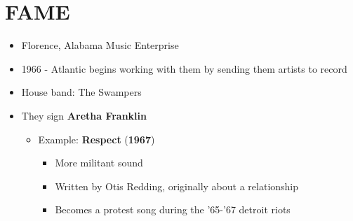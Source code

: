 \documentclass[11pt]{report}
\newcommand{\imp}[1]{\textbf{#1}}
\newcommand{\idate}[2]{\textcolor{blue!50}{\imp{#1}}\label{date:#2}}
\newcommand{\bl}{\begin{itemize}}
\newcommand{\kl}{\end{itemize}}
\newcommand{\song}[2]{\textcolor{red!70}{\textbf{#1}} (\idate{#2}{#1})}
\begin{document}
\section{FAME}
\begin{itemize}
	\item Florence, Alabama Music Enterprise
	\item 1966 - Atlantic begins working with them by sending them artists to record
	\item House band: The Swampers
	\item They sign \textbf{Aretha Franklin}
	\bl
		\item Example: \song{Respect}{1967}
		\bl
			\item More militant sound
			\item Written by Otis Redding, originally about a relationship
			\item Becomes a protest song during the '65-'67 detroit riots
		\kl
	\kl
\end{itemize}
\end{document}
